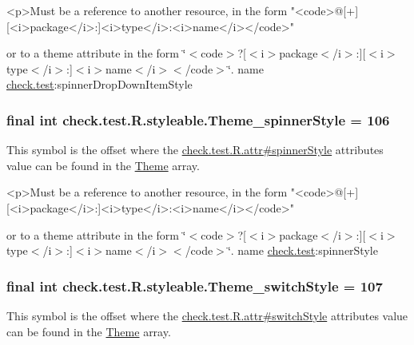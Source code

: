 \begin{DoxyVerb}      <p>Must be a reference to another resource, in the form "<code>@[+][<i>package</i>:]<i>type</i>:<i>name</i></code>"
\end{DoxyVerb}
 or to a theme attribute in the form \char`\"{}$<$code$>$?\mbox{[}$<$i$>$package$<$/i$>$\+:\mbox{]}\mbox{[}$<$i$>$type$<$/i$>$\+:\mbox{]}$<$i$>$name$<$/i$>$$<$/code$>$\char`\"{}.  name \hyperlink{namespacecheck_1_1test}{check.\+test}\+:spinner\+Drop\+Down\+Item\+Style \hypertarget{classcheck_1_1test_1_1_r_1_1styleable_aee62b48940c1b2da28bf4a38059b29ff}{}
\subsubsection[{Theme\+\_\+spinner\+Style}]{\setlength{\rightskip}{0pt plus 5cm}final int check.\+test.\+R.\+styleable.\+Theme\+\_\+spinner\+Style = 106\hspace{0.3cm}{\ttfamily [static]}}\label{classcheck_1_1test_1_1_r_1_1styleable_aee62b48940c1b2da28bf4a38059b29ff}
This symbol is the offset where the \hyperlink{classcheck_1_1test_1_1_r_1_1attr_a8fc35d027aa55da918e529af0239cd45}{check.\+test.\+R.\+attr\#spinner\+Style} attribute\textquotesingle{}s value can be found in the \hyperlink{classcheck_1_1test_1_1_r_1_1styleable_acca726d02016a0cf607782ec3a436a81}{Theme} array.

\begin{DoxyVerb}      <p>Must be a reference to another resource, in the form "<code>@[+][<i>package</i>:]<i>type</i>:<i>name</i></code>"
\end{DoxyVerb}
 or to a theme attribute in the form \char`\"{}$<$code$>$?\mbox{[}$<$i$>$package$<$/i$>$\+:\mbox{]}\mbox{[}$<$i$>$type$<$/i$>$\+:\mbox{]}$<$i$>$name$<$/i$>$$<$/code$>$\char`\"{}.  name \hyperlink{namespacecheck_1_1test}{check.\+test}\+:spinner\+Style \hypertarget{classcheck_1_1test_1_1_r_1_1styleable_a2816120337bd94eb4728d7a72ace5ce4}{}
\subsubsection[{Theme\+\_\+switch\+Style}]{\setlength{\rightskip}{0pt plus 5cm}final int check.\+test.\+R.\+styleable.\+Theme\+\_\+switch\+Style = 107\hspace{0.3cm}{\ttfamily [static]}}\label{classcheck_1_1test_1_1_r_1_1styleable_a2816120337bd94eb4728d7a72ace5ce4}
This symbol is the offset where the \hyperlink{classcheck_1_1test_1_1_r_1_1attr_a9ae7872d556d50683fe08cd498d71991}{check.\+test.\+R.\+attr\#switch\+Style} attribute\textquotesingle{}s value can be found in the \hyperlink{classcheck_1_1test_1_1_r_1_1styleable_acca726d02016a0cf607782ec3a436a81}{Theme} array.

